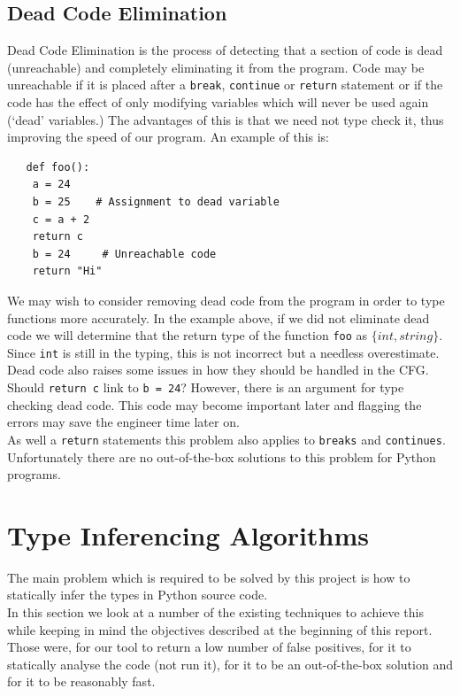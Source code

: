 \documentclass[12pt, titlepage]{article}
\begin{document}
\subsection{Dead Code Elimination}
Dead Code Elimination is the process of detecting that a section of code is dead (unreachable) and completely eliminating it from the program. Code may be unreachable if it is placed after a \texttt{break}, \texttt{continue} or \texttt{return} statement or if the code has the effect of only modifying variables which will never be used again (`dead' variables.) The advantages of this is that we need not type check it, thus improving the speed of our program.
An example of this is:
\begin{lstlisting}
   def foo():
   	a = 24
   	b = 25    # Assignment to dead variable
   	c = a + 2
   	return c
   	b = 24 	   # Unreachable code
   	return "Hi"
\end{lstlisting}
We may wish to consider removing dead code from the program in order to type functions more accurately. In the example above, if we did not eliminate dead code we will determine that the return type of the function \texttt{foo} as $\{int, string\}$. Since \texttt{int} is still in the typing, this is not incorrect but a needless overestimate. Dead code also raises some issues in how they should be handled in the CFG. Should \texttt{return c} link to \texttt{b = 24}? However, there is an argument for type checking dead code. This code may become important later and flagging the errors may save the engineer time later on. \\
\indent As well a \texttt{return} statements this problem also applies to \texttt{breaks} and \texttt{continues}. \\
\indent Unfortunately there are no out-of-the-box solutions to this problem for Python programs. \\

\newpage
\section{Type Inferencing Algorithms}
The main problem which is required to be solved by this project is how to statically infer the types in Python source code. \\
\indent In this section we look at a number of the existing techniques to achieve this while keeping in mind the objectives described at the beginning of this report. Those were, for our tool to return a low number of false positives, for it to statically analyse the code (not run it), for it to be an out-of-the-box solution and for it to be reasonably fast.
\end{document}

